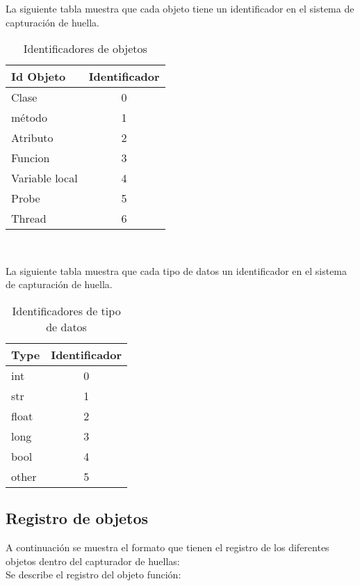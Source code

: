 \documentclass[10pt,a4paper]{article}
\begin{document}
La siguiente tabla muestra que cada objeto tiene un identificador en el sistema de capturación de huella.
\begin{table}[!h]
\begin{center}
\begin{tabular}{|l | c |}
\hline
Id Objeto & Identificador\\
\hline
Clase & 0\\
\hline
método & 1\\
\hline
Atributo & 2\\
\hline
Funcion & 3\\
\hline
Variable local & 4\\
\hline
Probe & 5\\
\hline
Thread & 6\\
\hline
\end{tabular}
\caption{Identificadores de objetos} 
\end{center}
\end{table}
\\
\pagebreak

La siguiente tabla muestra que cada tipo de datos un identificador en el sistema de capturación de huella.
\begin{table}[!h]
\begin{center}
\begin{tabular}{|l | c |}
\hline
Type & Identificador\\
\hline
int & 0\\
\hline
str & 1\\
\hline
float & 2\\
\hline
long & 3\\
\hline
bool & 4\\
\hline
other & 5\\
\hline
\end{tabular}
\caption{Identificadores de tipo de datos} 
\end{center}
\end{table}

\subsection{Registro de objetos}

A continuación se muestra el formato que tienen el registro de los diferentes objetos dentro del capturador de huellas:\\

Se describe el registro del objeto función:\\
\end{document}
